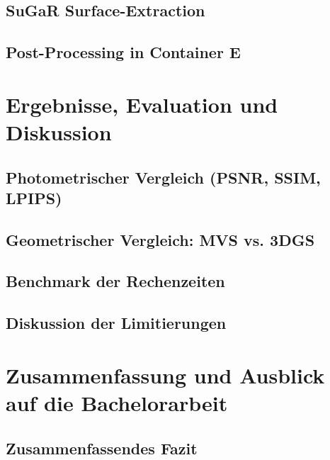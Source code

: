 \documentclass[12pt,twoside=false,a4paper,parskip]{scrbook}
\begin{document}
\section{SuGaR Surface-Extraction}

\section{Post-Processing in Container E}


\chapter{Ergebnisse, Evaluation und Diskussion} \label{sec:ergebnisse}

\section{Photometrischer Vergleich (PSNR, SSIM, LPIPS)}

\section{Geometrischer Vergleich: MVS vs. 3DGS}

\section{Benchmark der Rechenzeiten}

\section{Diskussion der Limitierungen}


\chapter{Zusammenfassung und Ausblick auf die Bachelorarbeit} \label{sec:fazit}

\section{Zusammenfassendes Fazit}
\end{document}
